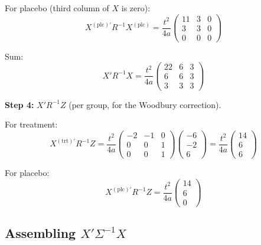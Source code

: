\documentclass[11pt]{article}
\begin{document}
For placebo (third column of $X$ is zero):
\begin{equation}
  X^{(\text{plc})\prime} R^{-1} X^{(\text{plc})}
  = \frac{t^2}{4a}\begin{pmatrix}
    11 & 3 & 0 \\ 3 & 3 & 0 \\ 0 & 0 & 0
  \end{pmatrix}
\end{equation}

Sum:
\begin{equation}
  X'R^{-1}X = \frac{t^2}{4a}\begin{pmatrix}
    22 & 6 & 3 \\ 6 & 6 & 3 \\ 3 & 3 & 3
  \end{pmatrix}
  \label{eq:XRX}
\end{equation}

\textbf{Step 4:} $X'R^{-1}Z$ (per group, for the Woodbury
correction).

For treatment:
\begin{equation}
  X^{(\text{trt})\prime} R^{-1} Z
  = \frac{t^2}{4a}\begin{pmatrix} -2&-1&0 \\ 0&0&1 \\ 0&0&1
  \end{pmatrix}
  \begin{pmatrix} -6 \\ -2 \\ 6 \end{pmatrix}
  = \frac{t^2}{4a}\begin{pmatrix} 14 \\ 6 \\ 6 \end{pmatrix}
\end{equation}

For placebo:
\begin{equation}
  X^{(\text{plc})\prime} R^{-1} Z
  = \frac{t^2}{4a}\begin{pmatrix} 14 \\ 6 \\ 0 \end{pmatrix}
\end{equation}


\subsection{Assembling $X'\Sigma^{-1}X$}
\end{document}
